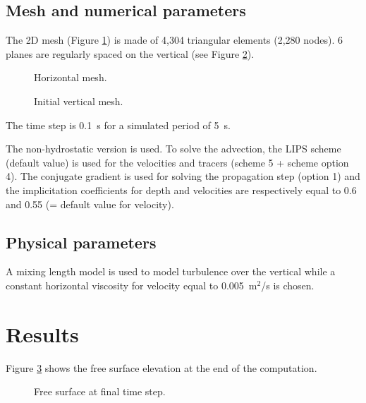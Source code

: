 \subsection{Mesh and numerical parameters}

The 2D mesh (Figure \ref{t3d:delwaq:fig:meshH})
is made of 4,304 triangular elements (2,280 nodes).
6 planes are regularly spaced on the vertical (see Figure \ref{t3d:delwaq:fig:meshV}).

\begin{figure}[!htbp]
 \centering
 \caption{Horizontal mesh.}
 \label{t3d:delwaq:fig:meshH}
\end{figure}

\begin{figure}[!htbp]
 \centering
 \caption{Initial vertical mesh.}
 \label{t3d:delwaq:fig:meshV}
\end{figure}

The time step is 0.1~s for a simulated period of 5~s.

The non-hydrostatic version is used.
To solve the advection, the LIPS scheme (default value)
is used for the velocities and tracers (scheme 5 + scheme option 4).
The conjugate gradient
is used for solving the propagation step (option 1) and
the implicitation coefficients
for depth and velocities are respectively equal to 0.6 and 0.55
(= default value for velocity).

\subsection{Physical parameters}

A mixing length model is used to model turbulence over the vertical
while a constant horizontal viscosity for velocity equal to 0.005~m$^2$/s is
chosen.

\section{Results}

Figure \ref{t3d:delwaq:FreeSurf} shows the free surface elevation at the end of
the computation.

\begin{figure}[H]
  \centering
  \caption{Free surface at final time step.}
  \label{t3d:delwaq:FreeSurf}
\end{figure}

